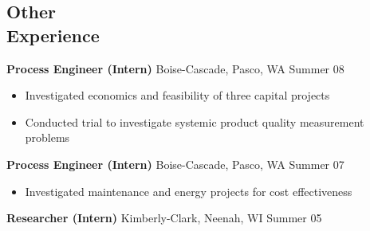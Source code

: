 \documentclass[margin]{res}
\newcommand{\bactivity}[3]{
  {\bf #1} #2 \hfill #3
    \vspace{6pt}
    \begin{itemize} \itemsep -2pt
      }
\newcommand{\eactivity}[0]{\end{itemize}}
\begin{document}
\begin{resume}
  \section{Other \\ Experience}
    \bactivity{Process Engineer (Intern)}{Boise-Cascade, Pasco, WA}{Summer 08}
      \item Investigated economics and feasibility of three capital projects 
      \item Conducted trial to investigate systemic product quality measurement problems 
    \eactivity

    \bactivity{Process Engineer (Intern)}{Boise-Cascade, Pasco, WA}{Summer 07}
      \item Investigated maintenance and energy projects for cost effectiveness 
    \eactivity

    {\bf Researcher (Intern)} Kimberly-Clark, Neenah, WI \hfill  Summer 05

\end{resume} 
\end{document}

